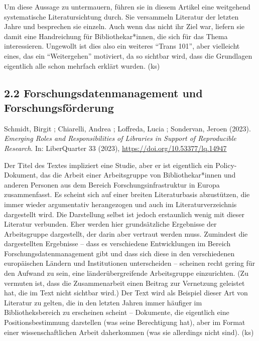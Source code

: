 \documentclass[a4paper,
fontsize=11pt,
oneside,
numbers=noperiodatend,
parskip=half-,
bibliography=totoc,
final
]{scrartcl}
\begin{document}
Um diese Aussage zu untermauern, führen sie in diesem Artikel eine
weitgehend systematische Literatursichtung durch. Sie versammeln
Literatur der letzten Jahre und besprechen sie einzeln. Auch wenn das
nicht ihr Ziel war, liefern sie damit eine Handreichung für
Bibliothekar*innen, die sich für das Thema interessieren. Ungewollt ist
dies also ein weiteres \enquote{Trans 101}, aber vielleicht eines, das
ein \enquote{Weitergehen} motiviert, da so sichtbar wird, dass die
Grundlagen eigentlich alle schon mehrfach erklärt wurden. (ks)

\hypertarget{forschungsdatenmanagement-und-forschungsfuxf6rderung}{%
\subsection{2.2 Forschungsdatenmanagement und
Forschungsförderung}\label{forschungsdatenmanagement-und-forschungsfuxf6rderung}}

Schmidt, Birgit ; Chiarelli, Andrea ; Loffreda, Lucia ; Sondervan,
Jeroen (2023). \emph{Emerging Roles and Responsibilities of Libraries in
Support of Reproducible Research}. In: LiberQuarter 33 (2023),
\url{https://doi.org/10.53377/lq.14947}

Der Titel des Textes impliziert eine Studie, aber er ist eigentlich ein
Policy-Dokument, das die Arbeit einer Arbeitsgruppe von
Bibliothekar*innen und anderen Personen aus dem Bereich
Forschungsinfrastruktur in Europa zusammenfasst. Es scheint sich auf
einer breiten Literaturbasis abzustützen, die immer wieder argumentativ
herangezogen und auch im Literaturverzeichnis dargestellt wird. Die
Darstellung selbst ist jedoch erstaunlich wenig mit dieser Literatur
verbunden. Eher werden hier grundsätzliche Ergebnisse der Arbeitsgruppe
dargestellt, der darin aber vertraut werden muss. Zumindest die
dargestellten Ergebnisse -- dass es verschiedene Entwicklungen im
Bereich Forschungsdatenmanagement gibt und dass sich diese in den
verschiedenen europäischen Ländern und Institutionen unterscheiden --
scheinen recht gering für den Aufwand zu sein, eine länderübergreifende
Arbeitsgruppe einzurichten. (Zu vermuten ist, dass die Zusammenarbeit
einen Beitrag zur Vernetzung geleistet hat, die im Text nicht sichtbar
wird.) Der Text wird als Beispiel dieser Art von Literatur zu gelten,
die in den letzten Jahren immer häufiger im Bibliotheksbereich zu
erscheinen scheint -- Dokumente, die eigentlich eine Positionsbestimmung
darstellen (was seine Berechtigung hat), aber im Format einer
wissenschaftlichen Arbeit daherkommen (was sie allerdings nicht sind).
(ks)
\end{document}
